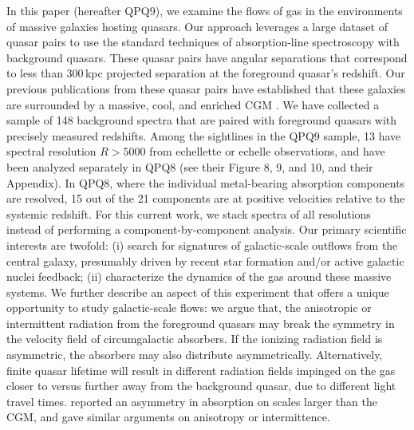 \documentclass[iop]{emulateapj}
\begin{document}
In this paper (hereafter QPQ9), we examine the flows of gas in the environments of massive
galaxies hosting quasars. Our approach leverages a large dataset of quasar pairs
\citep[][hereafter QPQ1]{QPQ1} to use the standard techniques of absorption-line spectroscopy
with background quasars. These quasar pairs
have angular separations that correspond to less than 300\,kpc projected separation at the
foreground quasar's redshift. Our previous publications from these quasar pairs have established
that these galaxies are surrounded by a massive, cool, and enriched CGM
\citep[QPQ5, QPQ6, QPQ7:][]{QPQ5,QPQ6,QPQ7}. We have collected a sample of 148 background
spectra that are paired with foreground quasars with precisely measured redshifts. Among the
sightlines in the QPQ9 sample, 13 have spectral resolution $R>5000$ from echellette or echelle
observations, and have been analyzed separately in QPQ8 (see their Figure 8, 9, and 10, and their
Appendix). In QPQ8, where the individual metal-bearing absorption components are resolved, 15 out
of the 21 components are at positive velocities relative to the systemic redshift. For this
current work, we stack spectra of all resolutions instead of performing a component-by-component
analysis. Our primary scientific interests are twofold: (i) search for signatures of galactic-scale
outflows from the central galaxy, presumably driven by recent star formation and/or active galactic
nuclei feedback; (ii) characterize the dynamics of the gas around these massive systems. We further
describe an aspect of this experiment that offers a unique opportunity to study galactic-scale
flows: we argue that, the anisotropic or intermittent radiation from the foreground quasars may
break the symmetry in the velocity field of circumgalactic absorbers. If the ionizing radiation
field is asymmetric, the absorbers may also distribute asymmetrically. Alternatively, finite quasar
lifetime will result in different radiation fields impinged on the gas closer to versus further
away from the background quasar, due to different light travel times. \cite{KirkmanTytler08}
reported an asymmetry in  absorption on scales larger than the CGM, and gave similar
arguments on anisotropy or intermittence.
\end{document}
